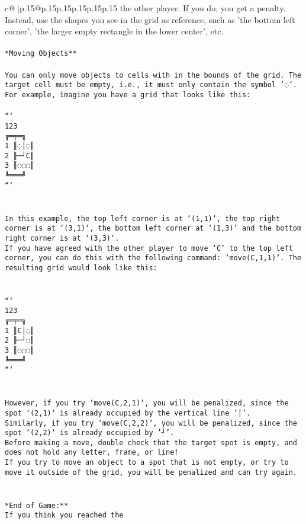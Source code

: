 \documentclass{article}
\begin{document}
{\begin{supertabular}{c@{$\;$}|p{.15\linewidth}@{}p{.15\linewidth}p{.15\linewidth}p{.15\linewidth}p{.15\linewidth}p{.15\linewidth}}
{{{the other player. If you do, you get a penalty. Instead, use the shapes you see in the grid as reference, such as 'the bottom left corner', 'the larger empty rectangle in the lower center', etc.\\ \tt \\ \tt **Moving Objects**\\ \tt \\ \tt * You can only move objects to cells with in the bounds of the grid. The target cell must be empty, i.e., it must only contain the symbol '◌'.\\ \tt * For example, imagine you have a grid that looks like this: \\ \tt \\ \tt ```\\ \tt     123\\ \tt    ╔═╤═╗\\ \tt  1 ║◌│◌║\\ \tt  2 ╟─┘C║\\ \tt  3 ║◌◌◌║\\ \tt    ╚═══╝\\ \tt ```\\ \tt \\ \tt \\ \tt * In this example, the top left corner is at `(1,1)`, the top right corner is at `(3,1)`, the bottom left corner at `(1,3)` and the bottom right corner is at `(3,3)`.\\ \tt * If you have agreed with the other player to move 'C' to the top left corner, you can do this with the following command: `move(C,1,1)`. The resulting grid would look like this: \\ \tt \\ \tt \\ \tt ```\\ \tt     123\\ \tt    ╔═╤═╗\\ \tt  1 ║C│◌║\\ \tt  2 ╟─┘◌║\\ \tt  3 ║◌◌◌║\\ \tt    ╚═══╝\\ \tt ```\\ \tt \\ \tt \\ \tt * However, if you try `move(C,2,1)`, you will be penalized, since the spot `(2,1)` is already occupied by the vertical line '│'.\\ \tt * Similarly, if you try `move(C,2,2)`, you will be penalized, since the spot `(2,2)` is already occupied by '┘'.\\ \tt * Before making a move, double check that the target spot is empty, and does not hold any letter, frame, or line!\\ \tt * If you try to move an object to a spot that is not empty, or try to move it outside of the grid, you will be penalized and can try again.\\ \tt \\ \tt \\ \tt **End of Game:**\\ \tt If you think you reached the }}}
\end{supertabular}}
\end{document}

